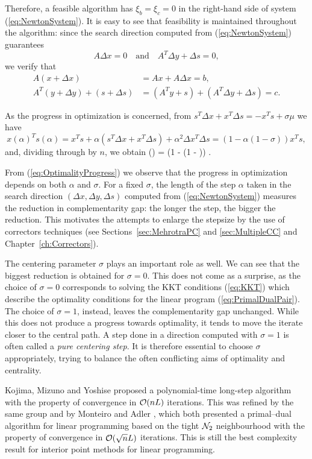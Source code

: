 Therefore, a feasible algorithm has $\xi_b = \xi_c = 0$
in the right-hand side of system (\ref{eq:NewtonSystem}). 
It is easy to see that feasibility
is maintained throughout the algorithm: since
the search direction computed from (\ref{eq:NewtonSystem})
guarantees
\[
  A \Delta x = 0 \quad \text{and} \quad
  A^T \Delta y + \Delta s = 0,
\]
we verify that
\[
  \begin{split}
  A (x + \Delta x) &= Ax + A\Delta x = b, \\
  A^T(y +\Delta y) + (s +\Delta s) &= (A^T y +s) + (A^T\Delta y +\Delta s) = c.
  \end{split}
\]

As the progress in optimization is concerned,
from $s^T \Delta x + x^T \Delta s = -x^Ts + \sigma\mu$
we have 
\[
   x(\alpha)^Ts(\alpha) = x^Ts + \alpha(s^T \Delta x + x^T \Delta s)
     + \alpha^2 \Delta x^T \Delta s = (1 - \alpha (1 - \sigma)) x^Ts,
\]
and, dividing through by $n$, we obtain
\be  \label{eq:OptimalityProgress}
   \mu(\alpha) = (1 - \alpha (1 - \sigma)) \mu.
\ee

From (\ref{eq:OptimalityProgress}) we observe that the progress in
optimization depends on both $\alpha$ and $\sigma$.
For a fixed $\sigma$, the length of the step $\alpha$ taken in 
the search direction
$(\Delta x,\Delta y ,\Delta s)$ computed from (\ref{eq:NewtonSystem})
measures the reduction in complementarity gap: 
the longer the step, the bigger the reduction. This motivates
the attempts to enlarge the stepsize by the use of correctors
techniques (see Sections~\ref{sec:MehrotraPC} and
\ref{sec:MultipleCC} and Chapter~\ref{ch:Correctors}).

The centering parameter $\sigma$ plays an important role as well.
We can see that the biggest reduction is obtained for $\sigma = 0$.
This does not come as a surprise, as the choice of $\sigma = 0$
corresponds to solving the KKT conditions (\ref{eq:KKT}) which
describe the optimality conditions for the linear program
(\ref{eq:PrimalDualPair}). The choice of $\sigma = 1$, instead,
leaves the complementarity gap unchanged. While this does not
produce a progress towards optimality, it tends to move the iterate
closer to the central path. A step done in a direction computed
with $\sigma = 1$ is often called a {\em pure centering step}.
It is therefore essential to choose $\sigma$ appropriately, trying
to balance the often conflicting aims of optimality and centrality.

Kojima, Mizuno and Yoshise \cite{KojimaMizunoYoshise89} 
proposed a polynomial-time long-step algorithm with the 
property of convergence in $\mathcal{O}(nL)$ iterations.
This was refined by the same group \cite{KojimaMizunoYoshise89b} 
and by Monteiro and Adler \cite{MonteiroAdler89a},
which both presented a primal--dual algorithm for linear programming 
based on the tight $\mathcal{N}_2$ neighbourhood
with the property of convergence in $\mathcal{O}(\sqrt{n}L)$ iterations.
This is still the best complexity result for interior point methods
for linear programming.

